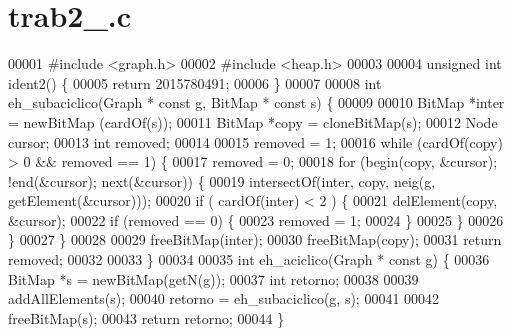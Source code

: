 \section{trab2\+\_.\+c}
\label{trab2__2015780491_8c_source}

\begin{DoxyCode}
00001 \textcolor{preprocessor}{#include <graph.h>}
00002 \textcolor{preprocessor}{#include <heap.h>}
00003 
00004 \textcolor{keywordtype}{unsigned} \textcolor{keywordtype}{int} ident2() \{
00005         \textcolor{keywordflow}{return} 2015780491;
00006 \}
00007 
00008 \textcolor{keywordtype}{int} eh_subaciclico(Graph * \textcolor{keyword}{const} g, BitMap * \textcolor{keyword}{const} s) \{
00009         
00010         BitMap *inter = newBitMap (cardOf(s));
00011         BitMap *copy = cloneBitMap(s);
00012         Node cursor;
00013         \textcolor{keywordtype}{int} removed;
00014         
00015         removed = 1;
00016         \textcolor{keywordflow}{while} (cardOf(copy) > 0 && removed == 1) \{
00017                 removed = 0;
00018                 \textcolor{keywordflow}{for} (begin(copy, &cursor); !end(&cursor); next(&cursor)) \{
00019                         intersectOf(inter, copy, neig(g, getElement(&cursor)));
00020                         \textcolor{keywordflow}{if} ( cardOf(inter) < 2 ) \{
00021                                 delElement(copy, &cursor);
00022                                 \textcolor{keywordflow}{if} (removed == 0) \{
00023                                         removed = 1;
00024                                 \}
00025                         \}
00026                 \}
00027         \}
00028 
00029         freeBitMap(inter);
00030         freeBitMap(copy);
00031         \textcolor{keywordflow}{return} removed;
00032         
00033 \}
00034 
00035 \textcolor{keywordtype}{int} eh_aciclico(Graph * \textcolor{keyword}{const} g) \{
00036         BitMap *s = newBitMap(getN(g));
00037         \textcolor{keywordtype}{int} retorno;
00038 
00039         addAllElements(s);
00040         retorno = eh_subaciclico(g, s);
00041 
00042         freeBitMap(s);
00043         \textcolor{keywordflow}{return} retorno;
00044 \}
\end{DoxyCode}

